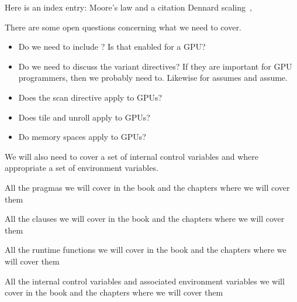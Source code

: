Here is an index entry:  Moore's law and a citation Dennard scaling~\cite{Dennard}, 


There are some open questions concerning what we need to cover.
\begin{itemize}
\item Do we need to include ?  Is that enabled for a GPU?  
\item Do we need to discuss the variant directives?  If they are 
important for GPU programmers, then we probably need to. Likewise for assumes and assume.  
\item Does the scan directive apply to GPUs?  
\item Does tile and unroll apply to GPUs?  
\item Do memory spaces apply to GPUs?
\end{itemize}

We will also need to cover a set of internal control variables and where appropriate a set of environment variables.

\begin{table}[h!]
\centering
\caption{All the pragmas we will cover in the book and the chapters where we will cover them}
\label{YourLabel}

 \end{table}

\begin{table}[h!]
\centering
\caption{All the clauses we will cover in the book and the chapters where we will cover them}
\label{YourLabel}

 \end{table}
 
\begin{table}[h!]
\centering
\caption{All the runtime functions we will cover in the book and the chapters where we will cover them}
\label{YourLabel}

 \end{table}
 
\begin{table}[h!]
\centering
\caption{All the internal control variables and associated environment variables we will 
cover in the book and the chapters where we will cover them}
\label{YourLabel}

 \end{table}


